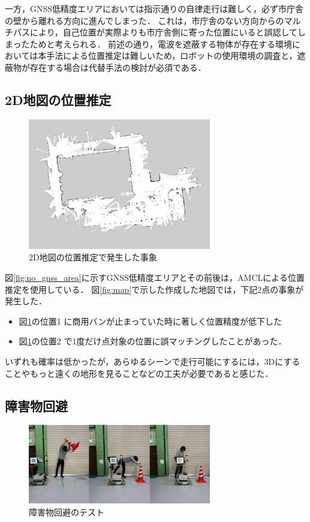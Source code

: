 \documentclass[platex,dvipdfmx]{rbproceedings}
\begin{document}
一方，GNSS低精度エリアにおいては指示通りの自律走行は難しく，必ず市庁舎の壁から離れる方向に進んでしまった．
これは，市庁舎のない方向からのマルチパスにより，自己位置が実際よりも市庁舎側に寄った位置にいると誤認してしまったためと考えられる．
前述の通り，電波を遮蔽する物体が存在する環境においては本手法による位置推定は難しいため，ロボットの使用環境の調査と，遮蔽物が存在する場合は代替手法の検討が必須である．

\subsection{2D地図の位置推定}
\begin{figure}[htbp]
    \centering   
    \includegraphics[keepaspectratio,width=80mm]{fig/map.png}
    \caption{2D地図の位置推定で発生した事象}
    \label{fig:map_lost}
\end{figure}

図\ref{fig:no_gnss_area}に示すGNSS低精度エリアとその前後は，AMCLによる位置推定を使用している．
図\ref{fig:map}で示した作成した地図では，下記2点の事象が発生した．
\begin{itemize}
    \item 図\ref{fig:map_lost}の位置1 に商用バンが止まっていた時に著しく位置精度が低下した
    \item 図\ref{fig:map_lost}の位置2 で1度だけ点対象の位置に誤マッチングしたことがあった．
\end{itemize}
いずれも確率は低かったが，あらゆるシーンで走行可能にするには，3Dにすることやもっと遠くの地形を見ることなどの工夫が必要であると感じた．

\subsection{障害物回避}
\begin{figure}[htbp]
    \centering   
    \includegraphics[keepaspectratio,width=80mm]{fig/avoidance.png}
    \caption{障害物回避のテスト}
    \label{fig:avoidance_test}
\end{figure}
\end{document}

